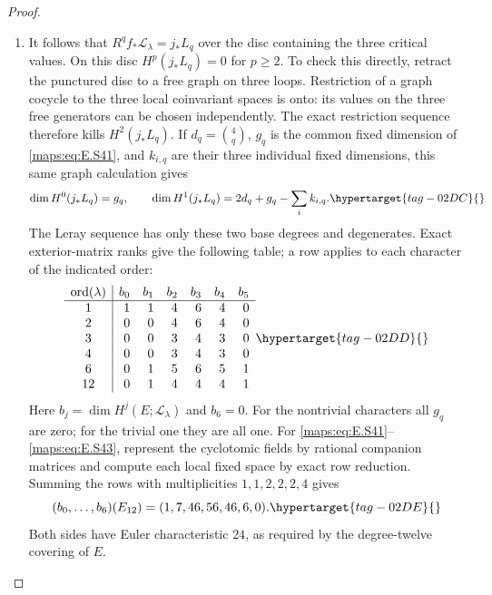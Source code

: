 \documentclass[11pt,a4paper]{article}
\numberwithin{equation}{section}
\theoremstyle{definition}
\begin{document}
\begin{proof}
\begin{enumerate}[label=\arabic*.,leftmargin=*]
\item It follows that $R^q f_*\mathcal L_\lambda=j_*L_q$ over
the disc containing the three critical values. On this
disc $H^p(j_*L_q)=0$ for $p\geq2$. To check this directly,
retract the punctured disc to a free graph on three loops.
Restriction of a graph cocycle to the three local
coinvariant spaces is onto: its values on the three free
generators can be chosen independently. The exact
restriction sequence therefore kills $H^2(j_*L_q)$.
If $d_q=\binom4q$, $g_q$ is the common fixed dimension of
\eqref{maps:eq:E.S41}, and $k_{i,q}$ are their three individual fixed
dimensions, this same graph calculation gives
\begin{equation}
 \dim H^0(j_*L_q)=g_q,\qquad
 \dim H^1(j_*L_q)=2d_q+g_q-\sum_i k_{i,q}.
 \hypertarget{tag-02DC}{}\label{maps:eq:E.S42}
\end{equation}
The Leray sequence has only these two base degrees and
degenerates. Exact exterior-matrix ranks give the following
table; a row applies to each character of the indicated
order:
\begin{equation}
 \begin{array}{c|rrrrrr}
 \operatorname{ord}(\lambda)&b_0&b_1&b_2&b_3&b_4&b_5\\ \hline
 1 &1&1&4&6&4&0\\
 2 &0&0&4&6&4&0\\
 3 &0&0&3&4&3&0\\
 4 &0&0&3&4&3&0\\
 6 &0&1&5&6&5&1\\
 12&0&1&4&4&4&1
 \end{array}
 \hypertarget{tag-02DD}{}\label{maps:eq:E.S43}
\end{equation}
Here $b_j=\dim H^j(E;\mathcal L_\lambda)$ and $b_6=0$.
For the nontrivial characters all $g_q$ are zero; for the
trivial one they are all one. For \eqref{maps:eq:E.S41}--\eqref{maps:eq:E.S43}, represent the
cyclotomic fields by rational companion matrices and compute each local
fixed space by exact row reduction.
Summing the rows with multiplicities $1,1,2,2,2,4$ gives
\begin{equation}
             (b_0,\ldots,b_6)(E_{12})=(1,7,46,56,46,6,0).
 \hypertarget{tag-02DE}{}\label{maps:eq:E.S44}
\end{equation}
Both sides have Euler characteristic $24$, as required by
the degree-twelve covering of $E$.


\end{enumerate}
\end{proof}
\end{document}
